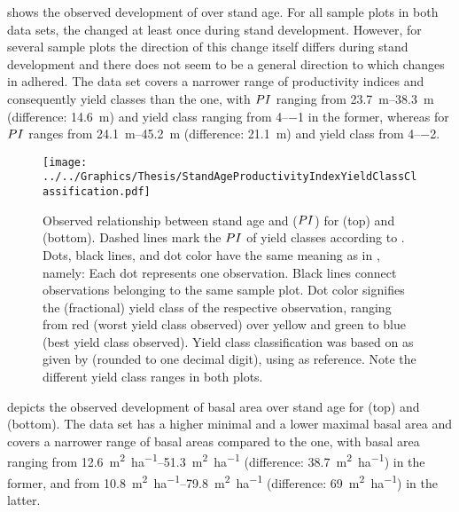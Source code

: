  shows the observed development of \ProductivityIndexText{} over stand age.  For all sample plots in both data sets, the \ProductivityIndexText{} changed at least once during stand development.  However, for several sample plots the direction of this change itself differs during stand development and there does not seem to be a general direction to which changes in \ProductivityIndexText{} adhered.  The \Beech{} data set covers a narrower range of productivity indices and consequently yield classes than the \Spruce{} one, with \(PI{}\) ranging from \SIrange{23.7}{38.3}{\meter} (difference: \SI{14.6}{\meter}) and yield class ranging from \numrange{4}{-1} in the former, whereas for \Spruce{} \(PI{}\) ranges from \SIrange{24.1}{45.2}{\meter} (difference: \SI{21.1}{\meter}) and yield class from \numrange{4}{-2}.

\begin{figure}[t]
  \texttt{[image: ../../Graphics/Thesis/StandAgeProductivityIndexYieldClassClassification.pdf]}
  \caption{Observed relationship between stand age and \ProductivityIndexText{} (\(PI{}\)) for \Beech{} (top) and \Spruce{} (bottom).  Dashed lines mark the \(PI{}\) of yield classes according to .  Dots, black lines, and dot color have the same meaning as in , namely:  Each dot represents one observation.  Black lines connect observations belonging to the same sample plot.  Dot color signifies the (fractional) yield class of the respective observation, ranging from red (worst yield class observed) over yellow and green to blue (best yield class observed).  Yield class classification was based on \ProductivityIndexText{} as given by  (rounded to one decimal digit), using  as reference.  Note the different yield class ranges in both plots.}
  \label{fig:StandAgeProductivityIndexYieldClassClassification}
\end{figure}

 depicts the observed development of basal area over stand age for \Beech{} (top) and \Spruce{} (bottom).
The \Beech{} data set has a higher minimal and a lower maximal basal area and covers a narrower range of basal areas compared to the \Spruce{} one, with basal area ranging from \SIrange{12.6}{51.3}{\square\meter\per\hectare} (difference: \SI{38.7}{\square\meter\per\hectare}) in the former, and from \SIrange{10.8}{79.8}{\square\meter\per\hectare} (difference: \SI{69}{\square\meter\per\hectare}) in the latter.

